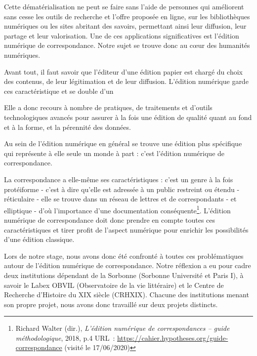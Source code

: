 Cette dématérialisation ne peut se faire sans l'aide de personnes qui améliorent sans cesse les outils de recherche et l'offre proposée en ligne, sur les bibliothèques numériques ou les sites abritant des savoirs, permettant ainsi leur diffusion, leur partage et leur valorisation. Une de ces applications significatives est l'édition numérique de correspondance. Notre sujet se trouve donc au c\oe ur des humanités numériques.

Avant tout, il faut savoir que l'éditeur d'une édition papier est chargé du choix des contenus, de leur légitimation et de leur diffusion. 
L'édition numérique garde ces caractéristique et se double d'un
\begin{quotation}
\end{quotation}

Elle a donc recours à nombre de pratiques, de traitements et d'outils technologiques avancés pour assurer à la fois une édition de qualité quant au fond et à la forme, et la pérennité des données.

Au sein de l'édition numérique en général se trouve une édition plus spécifique qui représente à elle seule un monde à part : c'est l'édition numérique de correspondance. 

La correspondance a elle-même ses caractéristiques : c'est un genre à la fois protéiforme - c'est à dire qu'elle est adressée à un public restreint ou étendu - réticulaire - elle se trouve dans un réseau de lettres et de correspondants - et elliptique - d'où l'importance d'une documentation conséquente\footnote{ Richard Walter (dir.), \emph{L’édition numérique de correspondances – guide méthodologique}, 2018, p.4 URL :  \url{https://cahier.hypotheses.org/guide-correspondance} (visité le 17/06/2020)}.
L'édition numérique de correspondance doit donc prendre en compte toutes ces caractéristiques et tirer profit de l'aspect numérique pour enrichir les possibilités d'une édition classique.

Lors de notre stage, nous avons donc été confronté à toutes ces problématiques autour de l'édition numérique de correspondance.
Notre réflexion a eu pour cadre deux institutions dépendant de la Sorbonne (Sorbonne Université et Paris I), à savoir le Labex OBVIL (Observatoire de la vie littéraire) et le Centre de Recherche d'Histoire du XIX siècle (CRHXIX). Chacune des institutions menant son propre projet, nous avons donc travaillé sur deux projets distincts. 

